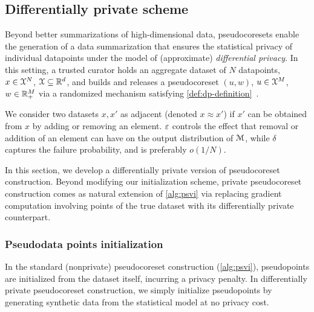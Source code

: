 \subsection{Differentially private scheme}
\label{sec:dp-pseudocoresets}

Beyond better summarizations of high-dimensional data, pseudocoresets enable the 
generation of a data summarization that ensures the statistical privacy of individual datapoints under the model of (approximate) \emph{differential privacy}. In this setting, a trusted
 curator holds an aggregate dataset of $N$ datapoints, $x\in\mathcal{X}^N$, $\mathcal{X}\subseteq \mathbb{R}^d$, and 
builds and releases a pseudocoreset $(u, w)$, $u\in\mathcal{X}^M$, $w\in\mathbb{R}_+^M$ via
a randomized mechanism satisfying \cref{def:dp-definition}~\citep{dwork06, ourdata}.

We consider two datasets $x, x'$ as adjacent (denoted 
$ x \approx x' $) if $ x' $ can be obtained from $ x $ by adding or removing an
element.  $ \varepsilon $ controls the effect that removal or addition of an element
can have on the output distribution of $\mathcal{M}$, while %
$ \delta $
captures the failure probability, 
and is preferably $ o(1/N)$. 

In this section, we develop a differentially private version of pseudocoreset construction.
Beyond modifying our initialization scheme, private pseudocoreset
construction comes as natural extension of \cref{alg:psvi}
 via replacing gradient computation involving points of the
true dataset with its differentially private counterpart. 


\subsubsection{Pseudodata points initialization}
\label{sec:pseudo-points-initilization}

In the standard (nonprivate) pseudocoreset construction (\cref{alg:psvi}), pseudopoints are initialized from the dataset itself,
incurring a privacy penalty. In differentially private pseudocoreset construction,
we simply initialize pseudopoints by generating synthetic data from the statistical model
at no privacy cost.



